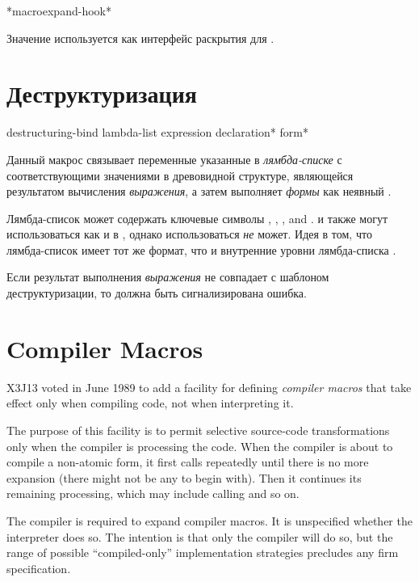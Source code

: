 \begin{defun}[Переменная]
*macroexpand-hook*

Значение  используется как интерфейс раскрытия для
.
\end{defun}

\section{Деструктуризация}

\begin{defmac}
destructuring-bind lambda-list expression {declaration}* {form}*

   Данный макрос связывает переменные указанные в \emph{лямбда-списке} с
   соответствующими значениями в древовидной структуре, являющейся результатом
   вычисления \emph{выражения}, а затем выполняет \emph{формы} как неявный .

Лямбда-список может содержать ключевые символы , , 
, and .
 и  также могут использоваться как и в ,
однако  использоваться \emph{не} может.
Идея в том, что лямбда-список  имеет тот же формат, что
и внутренние уровни лямбда-списка .

Если результат выполнения \emph{выражения} не совпадает с шаблоном
деструктуризации, то должна быть сигнализирована ошибка.
\end{defmac}

\section{Compiler Macros}

X3J13 voted in June 1989 
to add a facility for defining \emph{compiler macros} that
take effect only when compiling code, not when interpreting it.

The purpose of this facility is to permit selective source-code
transformations only when the compiler is processing the code.
When the compiler is about to compile a non-atomic form, it first calls
 repeatedly until there is no more expansion
(there might not be any to begin with).  Then it continues its
remaining processing, which may include calling  and so on.

The compiler is required to expand compiler macros.  It is unspecified
whether the interpreter does so.  The intention is that only the
compiler will do so, but the range of possible ``compiled-only''
implementation strategies precludes any firm specification.


